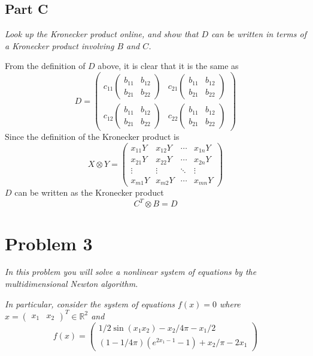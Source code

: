\documentclass{article}
\begin{document}
\subsection*{Part C}

\textit{Look up the Kronecker product online, and show that $D$ can be
written in terms of a Kronecker product involving $B$ and $C$.}

\bigbreak

From the definition of $ D $ above, it is clear that it is the same as
$$ D = \begin{pmatrix}
    c_{11} \begin{pmatrix}
        b_{11} & b_{12} \\
        b_{21} & b_{22}
    \end{pmatrix} & c_{21} \begin{pmatrix}
        b_{11} & b_{12} \\
        b_{21} & b_{22}
    \end{pmatrix} \\
    c_{12} \begin{pmatrix}
        b_{11} & b_{12} \\
        b_{21} & b_{22}
    \end{pmatrix} & c_{22} \begin{pmatrix}
        b_{11} & b_{12} \\
        b_{21} & b_{22}
    \end{pmatrix}
\end{pmatrix} $$
Since the definition of the Kronecker product is
$$ X \otimes Y = \begin{pmatrix}
    x_{11} Y & x_{12} Y & \cdots & x_{1n} Y \\
    x_{21} Y & x_{22} Y & \cdots & x_{2n} Y \\
    \vdots & \vdots & \ddots & \vdots \\
    x_{m1} Y & x_{m2} Y & \cdots & x_{mn} Y
\end{pmatrix} $$
$ D $ can be written as the Kronecker product
$$ C^T \otimes B = D $$

\section*{Problem 3}

\textit{In this problem you will solve a nonlinear system of equations by the
multidimensional Newton algorithm.}

\textit{In particular, consider the system of equations $f(x) = 0$ where $x =
\begin{pmatrix} x_1 & x_2 \end{pmatrix}^T \in \mathbb{R}^2$ and}
$$ f(x) = \begin{pmatrix}
    1 / 2 \sin(x_1 x_2) - x_2 / 4 \pi - x_1 / 2 \\
    \left(1 - 1 / 4 \pi \right) \left(e^{2 x_1 - 1} - 1\right) + x_2 / \pi - 2x_1
\end{pmatrix} $$
\end{document}
